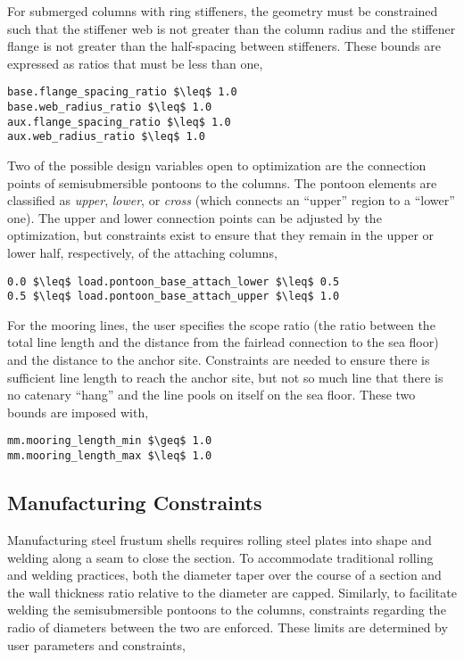 For submerged columns with ring stiffeners, the geometry must be
constrained such that the stiffener web is not greater than the column
radius and the stiffener flange is not greater than the half-spacing
between stiffeners.  These bounds are expressed as ratios that must be
less than one,
\begin{lstlisting}
base.flange_spacing_ratio $\leq$ 1.0
base.web_radius_ratio $\leq$ 1.0
aux.flange_spacing_ratio $\leq$ 1.0
aux.web_radius_ratio $\leq$ 1.0
\end{lstlisting}

Two of the possible design variables open to optimization are the
connection points of semisubmersible pontoons to the columns.  The
pontoon elements are classified as \textit{upper}, \textit{lower}, or
\textit{cross} (which connects an ``upper'' region to a ``lower'' one).
The upper and lower connection points can be adjusted by the
optimization, but constraints exist to ensure that they remain in the
upper or lower half, respectively, of the attaching columns,
\begin{lstlisting}
0.0 $\leq$ load.pontoon_base_attach_lower $\leq$ 0.5
0.5 $\leq$ load.pontoon_base_attach_upper $\leq$ 1.0
\end{lstlisting}

For the mooring lines, the user specifies the scope ratio (the ratio
between the total line length and the distance from the fairlead
connection to the sea floor) and the distance to the anchor site.
Constraints are needed to ensure there is sufficient line length to
reach the anchor site, but not so much line that there is no catenary
``hang'' and the line pools on itself on the sea floor.  These two
bounds are imposed with,
\begin{lstlisting}
mm.mooring_length_min $\geq$ 1.0
mm.mooring_length_max $\leq$ 1.0
\end{lstlisting}


\subsection{Manufacturing Constraints}
Manufacturing steel frustum shells requires rolling steel plates into
shape and welding along a seam to close the section.  To accommodate
traditional rolling and welding practices, both the diameter taper over
the course of a section and the wall thickness ratio relative to the
diameter are capped.  Similarly, to facilitate welding the
semisubmersible pontoons to the columns, constraints regarding the radio
of diameters between the two are enforced. These limits are determined
by user parameters and constraints,

